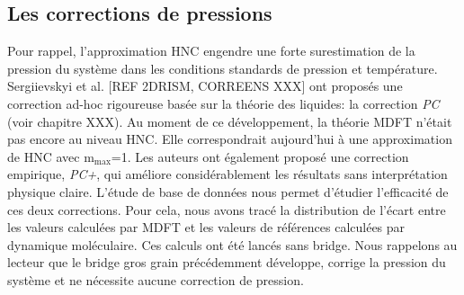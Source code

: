 \subsection{Les corrections de pressions}\label{sec:corrections_pression}
Pour rappel, l'approximation HNC engendre une forte surestimation de la pression du système dans les conditions standards de pression et température. Sergiievskyi et al. \cite{sergiievskyi_solvation_2015,sergiievskyi_pressure_2015} [REF 2DRISM, CORREENS XXX] ont proposés une correction ad-hoc rigoureuse basée sur la théorie des liquides: la correction \textit{PC} (voir chapitre XXX). Au moment de ce développement, la théorie MDFT n'était pas encore au niveau HNC. Elle correspondrait aujourd'hui à une approximation de HNC avec $\mathrm{m}_\mathrm{max}$=1. Les auteurs ont également proposé une correction empirique, \textit{PC+}, qui améliore considérablement les résultats sans interprétation physique claire. L'étude de base de données nous permet d'étudier l'efficacité de ces deux corrections. Pour cela, nous avons tracé la distribution de l'écart entre les valeurs calculées par MDFT et les valeurs de références calculées par dynamique moléculaire. Ces calculs ont été lancés sans bridge. Nous rappelons au lecteur que le bridge gros grain précédemment développe, corrige la pression du système et ne nécessite aucune correction de pression.

